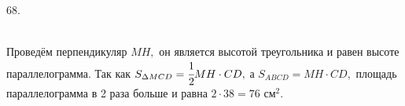 68. \begin{figure}[ht!]
\end{figure}\\
Проведём перпендикуляр $MH,$ он является высотой треугольника и равен высоте параллелограмма. Так как $S_{\Delta MCD}=\cfrac{1}{2}MH\cdot CD,$ а $S_{ABCD}=MH\cdot CD,$ площадь параллелограмма в 2 раза больше и равна $2\cdot38=76\text{ см}^2.$\\
